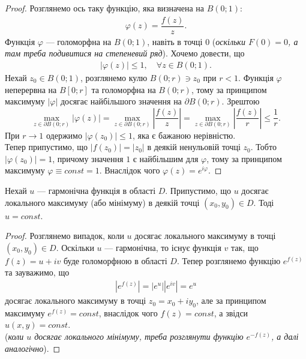 \documentclass{math_library}
\begin{document}
\begin{proof}
Розглянемо ось таку функцію, яка визначена на $B(0;1)$:
\begin{align*}
\varphi(z) = \dfrac{f(z)}{z}.
\end{align*}
Функція $\varphi$ --- голоморфна на $B(0;1)$, навіть в точці $0$ (\textit{оскільки $F(0) = 0$, а там треба подивитися на степеневий ряд}). Хочемо довести, що
\begin{align*}
|\varphi(z)| \leq 1, \quad \forall z \in B(0;1).
\end{align*}
Нехай $z_0 \in B(0;1)$, розглянемо кулю $B(0;r) \ni z_0$ при $r < 1$. Функція $\varphi$ неперервна на $B[0;r]$ та голоморфна на $B(0;r)$, тому за принципом максимуму $|\varphi|$ досягає найбільшого значення на $\partial B(0;r)$. Зрештою
\[
\max_{z \in \partial B(0;r)} |\varphi(z)| = \max_{z \in \partial B(0;r)} \left| \dfrac{f(z)}{z} \right| = \max_{z \in \partial B(0;r)} \left| \dfrac{f(z)}{r} \right| \leq \dfrac{1}{r}.
\]
При $r \to 1$ одержимо $|\varphi(z_0)| \leq 1$, яка є бажаною нерівністю.
\bigskip \\
Тепер припустимо, що $|f(z_0)| = |z_0|$ в деякій ненульовій точці $z_0$. Тобто $|\varphi(z_0)| = 1$, причому значення $1$ є найбільшим для $\varphi$, тому за принципом максимуму $\varphi \equiv const = 1$. Внаслідок чого $\varphi(z) = e^{i\varphi}$.
\end{proof}

\begin{theorem}
Нехай $u$ --- гармонічна функція в області $D$. Припустимо, що $u$ досягає локального максимуму (або мінімуму) в деякій точці $(x_0,y_0) \in D$. Тоді $u = const$.
\end{theorem}

\begin{proof}
Розглянемо випадок, коли $u$ досягає локального максимуму в точці $(x_0,y_0) \in D$. Оскільки $u$ --- гармонічна, то існує функція $v$ так, що $f(z) = u + iv$ буде голоморфною в області $D$. Тепер розглянемо функцію $e^{f(z)}$ та зауважимо, що
\begin{align*}
|e^{f(z)}| = |e^{u}| |e^{iv}| = e^u
\end{align*}
досягає локального максимуму в точці $z_0 = x_0 + iy_0$, але за принципом максимуму $e^{f(z)} = const$, внаслідок чого $f(z) = const$, а звідси $u(x,y) = const$.\\
(\textit{коли $u$ досягає локального мінімуму, треба розглянути функцію $e^{-f(z)}$, а далі аналогічно}).
\end{proof}
\end{document}
